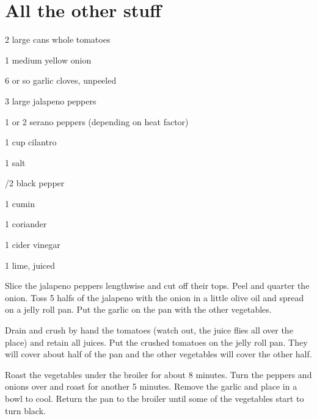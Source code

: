 \chapter{All the other stuff}


%
%
%
%
\newpage



\begin{IngredientsAndSteps}
    \ListIngredientsAndSteps
    {
        2 large cans whole tomatoes

        1 medium yellow onion

        6 or so garlic cloves, unpeeled

        3 large jalapeno peppers

        1 or 2 serano peppers (depending on heat factor)

        1 cup cilantro

        1 \tsp salt

        /2 \tsp black pepper

        1 \tsp cumin

        1 \tsp coriander

        1 \tsp cider vinegar

        1 lime, juiced
    }
    {
        Slice the jalapeno peppers lengthwise and cut off their tops. Peel and
        quarter the onion. Toss 5 halfs of the jalapeno with the onion in a
        little olive oil and spread on a jelly roll pan. Put the garlic on the
        pan with the other vegetables.

        Drain and crush by hand the tomatoes (watch out, the juice flies all
        over the place) and retain all juices. Put the crushed tomatoes on the
        jelly roll pan. They will cover about half of the pan and the other
        vegetables will cover the other half.

        Roast the vegetables under the broiler for about 8 minutes. Turn the
        peppers and onions over and roast for another 5 minutes. Remove the
        garlic and place in a bowl to cool. Return the pan to the broiler until
        some of the vegetables start to turn black.

}
\end{IngredientsAndSteps}
